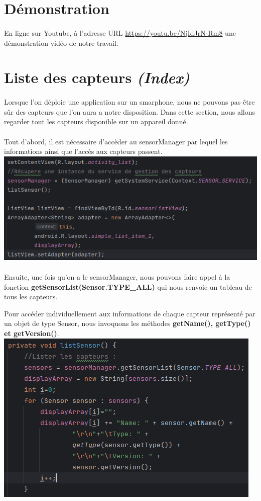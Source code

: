 \documentclass[a4paper]{article}
\begin{document}
\begin{multicols}{2}
        \section*{Démonstration}
            \paragraph{}
            En ligne sur Youtube, à l'adresse URL \url{https://youtu.be/NjIdJrN-Rm8} une démonstration vidéo de notre travail.
        \section{Liste des capteurs \emph{(Index)}}
            \paragraph{}
                Lorsque l'on déploie une application sur un smarphone, nous ne pouvons pas être sûr des capteurs que l'on aura a notre disposition. Dans cette section, nous allons regarder tout les capteurs disponible sur un appareil donné.
            \paragraph{}
                Tout d'abord, il est nécessaire d'accèder au sensorManager par lequel les informations ainsi que l'accès aux capteurs passent.
                \includegraphics[width=.49\textwidth]{listeCapteur/sensorManager}
            \paragraph{}
                Ensuite, une fois qu'on a le sensorManager, nous pouvons faire appel à la fonction \textbf{getSensorList(Sensor.TYPE\_ALL)} qui nous renvoie un tableau de tous les capteurs.
                
                Pour accéder individuellement aux informations de chaque capteur représenté par un objet de type Sensor, nous invoquons les méthodes \textbf{getName(), getType() et getVersion()}.
                \noindent\includegraphics[width=.49\textwidth]{listeCapteur/listSensor}

\end{multicols}
\end{document}
